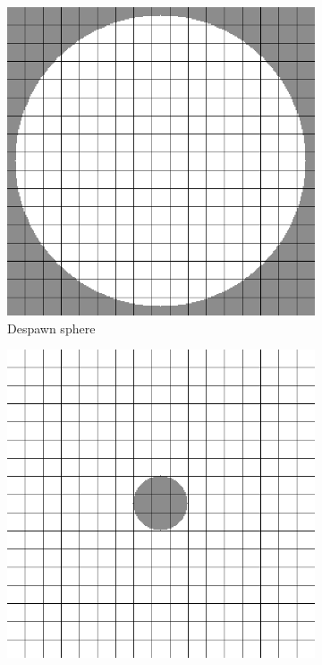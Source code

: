\documentclass[12pt]{article}
\begin{document}
\begin{figure}[H]
\begin{subfigure}{0.333\textwidth}
\includegraphics[width=.9\linewidth]{despawn-sphere.png}
\caption{Despawn sphere}
\label{fig:despawn-sphere}
\end{subfigure}%
\begin{subfigure}{0.333\textwidth}
\includegraphics[width=.9\linewidth]{exclusion-sphere.png}

\end{subfigure}
\end{figure}
\end{document}
